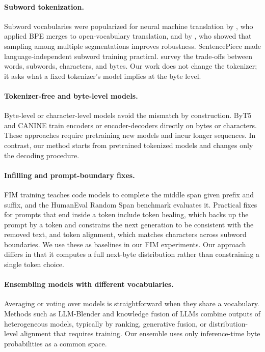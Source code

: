 \documentclass{article} %
\begin{document}
\paragraph{Subword tokenization.} Subword vocabularies were popularized for neural machine translation by \citet{sennrich2016bpe}, who applied BPE merges to open-vocabulary translation, and by \citet{kudo2018subword}, who showed that sampling among multiple segmentations improves robustness. SentencePiece \citep{kudo2018sentencepiece} made language-independent subword training practical. \citet{mielke2021words} survey the trade-offs between words, subwords, characters, and bytes. Our work does not change the tokenizer; it asks what a fixed tokenizer's model implies at the byte level.

\paragraph{Tokenizer-free and byte-level models.} Byte-level or character-level models avoid the mismatch by construction. ByT5 \citep{xue2022byt5} and CANINE \citep{clark2022canine} train encoders or encoder-decoders directly on bytes or characters. These approaches require pretraining new models and incur longer sequences. In contrast, our method starts from pretrained tokenized models and changes only the decoding procedure.

\paragraph{Infilling and prompt-boundary fixes.} FIM training \citep{bavarian2022fim} teaches code models to complete the middle span given prefix and suffix, and the HumanEval Random Span benchmark \citep{chen2021humaneval,bavarian2022fim} evaluates it. Practical fixes for prompts that end inside a token include token healing, which backs up the prompt by a token and constrains the next generation to be consistent with the removed text, and token alignment, which matches characters across subword boundaries. We use these as baselines in our FIM experiments. Our approach differs in that it computes a full next-byte distribution rather than constraining a single token choice.

\paragraph{Ensembling models with different vocabularies.} Averaging or voting over models is straightforward when they share a vocabulary. Methods such as LLM-Blender \citep{jiang2023llmblender} and knowledge fusion of LLMs \citep{wan2024fusellm} combine outputs of heterogeneous models, typically by ranking, generative fusion, or distribution-level alignment that requires training. Our ensemble uses only inference-time byte probabilities as a common space.
\end{document}
